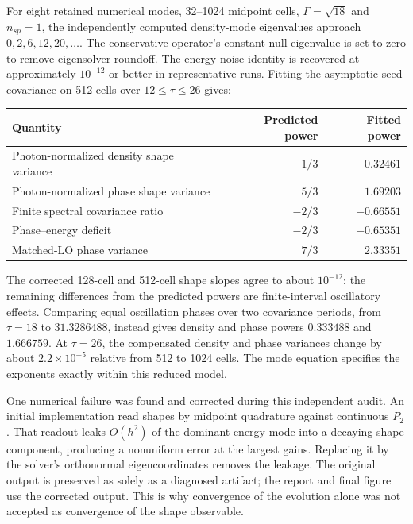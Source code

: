 \documentclass[11pt,a4paper]{article}
\begin{document}
For eight retained numerical modes, 32--1024 midpoint cells, $\Gamma=\sqrt{18}$ and $n_{sp}=1$, the independently computed density-mode eigenvalues approach $0,2,6,12,20,\ldots$. The conservative operator's constant null eigenvalue is set to zero to remove eigensolver roundoff. The energy-noise identity is recovered at approximately $10^{-12}$ or better in representative runs. Fitting the asymptotic-seed covariance on 512 cells over $12\le\tau\le26$ gives:
\begin{center}
\begin{tabular}{@{}lrr@{}}\toprule
Quantity & Predicted power & Fitted power \\\midrule
Photon-normalized density shape variance & $1/3$ & $0.32461$ \\
Photon-normalized phase shape variance & $5/3$ & $1.69203$ \\
Finite spectral covariance ratio & $-2/3$ & $-0.66551$ \\
Phase--energy deficit & $-2/3$ & $-0.65351$ \\
Matched-LO phase variance & $7/3$ & $2.33351$ \\\bottomrule
\end{tabular}
\end{center}
The corrected 128-cell and 512-cell shape slopes agree to about $10^{-12}$: the remaining differences from the predicted powers are finite-interval oscillatory effects. Comparing equal oscillation phases over two covariance periods, from $\tau=18$ to $31.3286488$, instead gives density and phase powers $0.333488$ and $1.666759$. At $\tau=26$, the compensated density and phase variances change by about $2.2\times10^{-5}$ relative from 512 to 1024 cells. The mode equation specifies the exponents exactly within this reduced model.

One numerical failure was found and corrected during this independent audit. An initial implementation read shapes by midpoint quadrature against continuous $P_2$. That readout leaks $O(h^2)$ of the dominant energy mode into a decaying shape component, producing a nonuniform error at the largest gains. Replacing it by the solver's orthonormal eigencoordinates removes the leakage. The original output is preserved as  solely as a diagnosed artifact; the report and final figure use the corrected output. This is why convergence of the evolution alone was not accepted as convergence of the shape observable.
\end{document}
